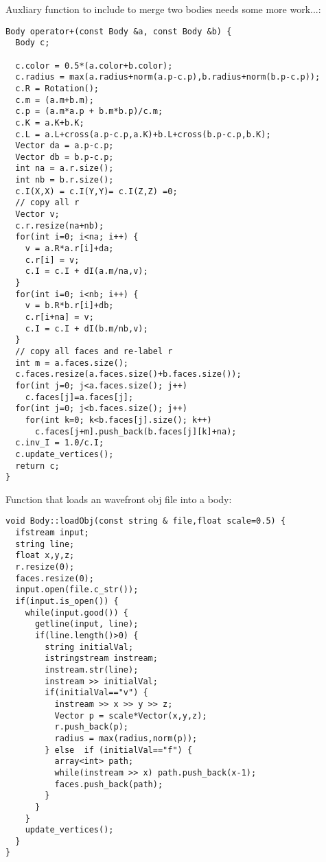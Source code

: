 \noindent
Auxliary function to include to merge two bodies
needs some more work...: \begin{lstlisting}
Body operator+(const Body &a, const Body &b) {
  Body c;

  c.color = 0.5*(a.color+b.color);
  c.radius = max(a.radius+norm(a.p-c.p),b.radius+norm(b.p-c.p));
  c.R = Rotation();
  c.m = (a.m+b.m);
  c.p = (a.m*a.p + b.m*b.p)/c.m;
  c.K = a.K+b.K;
  c.L = a.L+cross(a.p-c.p,a.K)+b.L+cross(b.p-c.p,b.K);
  Vector da = a.p-c.p;
  Vector db = b.p-c.p;
  int na = a.r.size();
  int nb = b.r.size();
  c.I(X,X) = c.I(Y,Y)= c.I(Z,Z) =0;
  // copy all r
  Vector v;
  c.r.resize(na+nb);
  for(int i=0; i<na; i++) {
    v = a.R*a.r[i]+da;
    c.r[i] = v;
    c.I = c.I + dI(a.m/na,v);
  }
  for(int i=0; i<nb; i++) {
    v = b.R*b.r[i]+db;
    c.r[i+na] = v;
    c.I = c.I + dI(b.m/nb,v);
  }
  // copy all faces and re-label r
  int m = a.faces.size();
  c.faces.resize(a.faces.size()+b.faces.size());
  for(int j=0; j<a.faces.size(); j++)
    c.faces[j]=a.faces[j];
  for(int j=0; j<b.faces.size(); j++)
    for(int k=0; k<b.faces[j].size(); k++)
      c.faces[j+m].push_back(b.faces[j][k]+na);
  c.inv_I = 1.0/c.I;
  c.update_vertices();
  return c;
}
\end{lstlisting}
\noindent
Function that loads an wavefront obj file into a body: \begin{lstlisting}
void Body::loadObj(const string & file,float scale=0.5) {
  ifstream input;
  string line;
  float x,y,z;
  r.resize(0);
  faces.resize(0);
  input.open(file.c_str());
  if(input.is_open()) {
    while(input.good()) {
      getline(input, line);
      if(line.length()>0) {
        string initialVal;
        istringstream instream;
        instream.str(line);
        instream >> initialVal;
        if(initialVal=="v") {
          instream >> x >> y >> z;
          Vector p = scale*Vector(x,y,z);
          r.push_back(p);
          radius = max(radius,norm(p));
        } else  if (initialVal=="f") {
          array<int> path;
          while(instream >> x) path.push_back(x-1);
          faces.push_back(path);
        }
      }
    }
    update_vertices();
  }
}
\end{lstlisting}
\noindent
